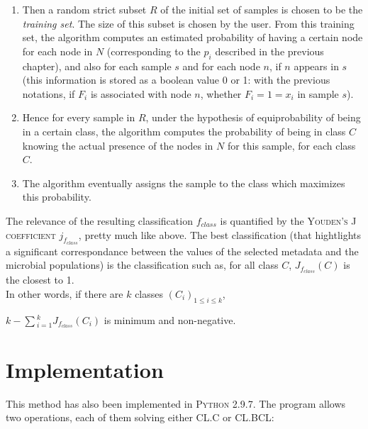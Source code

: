\documentclass{report}
\begin{document}
\begin{enumerate}
\item Then a random strict subset $R$ of the initial set of samples is chosen to be the \emph{training set}. The size of this subset is chosen by the user. From this training set, the algorithm computes an estimated probability of having a certain node for each node in $N$ (corresponding to the $p_{i}$ described in the previous chapter), and also for each sample $s$ and for each node $n$, if $n$ appears in $s$ (this information is stored as a boolean value 0 or 1: with the previous notations, if $F_{i}$ is associated with node $n$, whether $F_{i} = 1 = x_{i}$ in sample $s$).

\item Hence for every sample in $R$, under the hypothesis of equiprobability of being in a certain class, the algorithm computes the probability of being in class $C$ knowing the actual presence of the nodes in $N$ for this sample, for each class $C$. 

\item The algorithm eventually assigns the sample to the class which maximizes this probability.

\end{enumerate}

The relevance of the resulting classification $f_{class}$ is quantified by the \textsc{Youden's J coefficient} $j_{f_{class}}$, pretty much like above. The best classification (that hightlights a significant correspondance between the values of the selected metadata and the microbial populations) is the classification such as, for all class $C$, $J_{f_{class}}(C)$ is the closest to 1.\\

In other words, if there are $k$ classes $(C_{i})_{1 \le i \le k}$,\\

\begin{center}
$k - \sum{_{i = 1}^{k}}{J_{f_{class}}(C_{i})}$ is minimum and non-negative.
\end{center}

\section{Implementation}

This method has also been implemented in \textsc{Python 2.9.7}. The program allows two operations, each of them solving either \textsc{CL.C} or \textsc{CL.BCL}:\\
\end{document}
